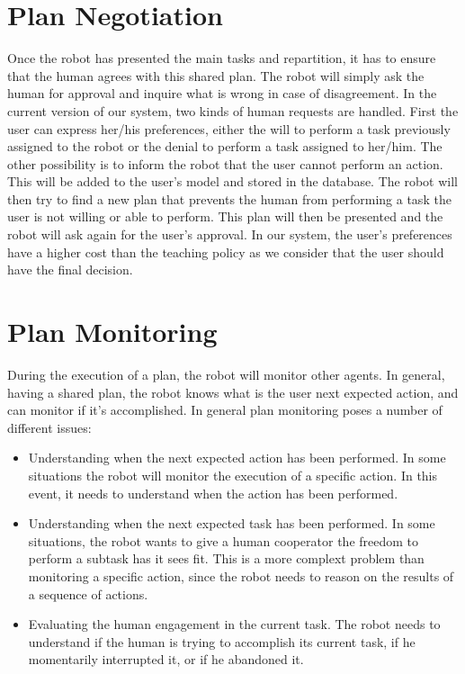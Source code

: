 \section{Plan Negotiation}
Once the robot has presented the main tasks and repartition, it has to ensure that the human agrees with this shared plan. The robot will simply ask the human for approval and inquire what is wrong in case of disagreement.
In the current version of our system, two kinds of human requests are handled. First the user can express her/his preferences, either the will to perform a task previously assigned to the robot or the denial to perform a task assigned to her/him. The other possibility is to inform the robot that the user cannot perform an action. This will be added to the user's model and stored in the database. The robot will then try to find a new plan that prevents the human from performing a task the user is not willing or able to perform. This plan will then be presented and the robot will ask again for the user's approval. In our system, the user's preferences have a higher cost than the teaching policy as we consider that the user should have the final decision.



\section{Plan Monitoring}
During the execution of a plan, the robot will monitor other agents. In general, having a shared plan, the robot knows what is the user next expected action, and can monitor if it's accomplished. In general plan monitoring poses a number of different issues:
\begin{itemize}
\item Understanding when the next expected action has been performed. In some situations the robot will monitor the execution of a specific action. In this event, it needs to understand when the action has been performed.
\item Understanding when the next expected task has been performed. In some situations, the robot wants to give a human cooperator the freedom to perform a subtask has it sees fit. This is a more complext problem than monitoring a specific action, since the robot needs to reason on the results of a sequence of actions.
\item Evaluating the human engagement in the current task. The robot needs to understand if the human is trying to accomplish its current task, if he momentarily interrupted it, or if he abandoned it.
\end{itemize}


